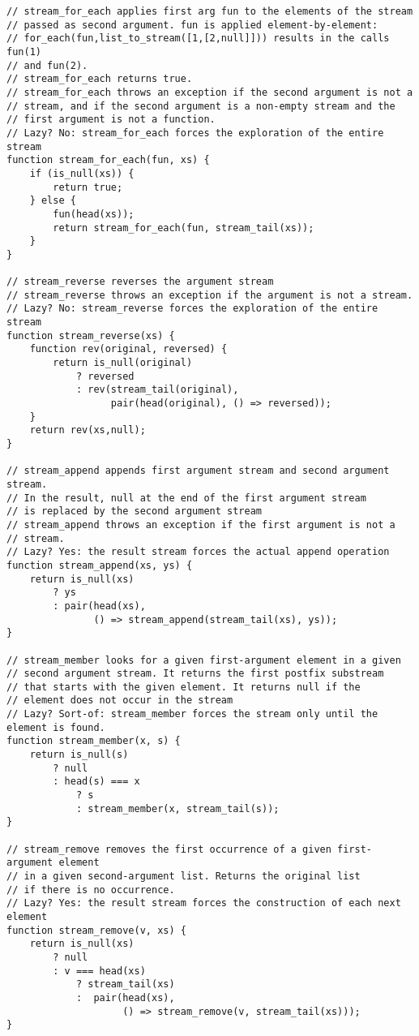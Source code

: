 \begin{lstlisting}
// stream_for_each applies first arg fun to the elements of the stream
// passed as second argument. fun is applied element-by-element:
// for_each(fun,list_to_stream([1,[2,null]])) results in the calls fun(1)
// and fun(2).
// stream_for_each returns true.
// stream_for_each throws an exception if the second argument is not a 
// stream, and if the second argument is a non-empty stream and the
// first argument is not a function.
// Lazy? No: stream_for_each forces the exploration of the entire stream
function stream_for_each(fun, xs) {
    if (is_null(xs)) {
        return true;
    } else {
        fun(head(xs));
        return stream_for_each(fun, stream_tail(xs));
    }
}

// stream_reverse reverses the argument stream
// stream_reverse throws an exception if the argument is not a stream.
// Lazy? No: stream_reverse forces the exploration of the entire stream
function stream_reverse(xs) {
    function rev(original, reversed) {
        return is_null(original)
            ? reversed
            : rev(stream_tail(original), 
                  pair(head(original), () => reversed));
    }
    return rev(xs,null);
}

// stream_append appends first argument stream and second argument stream.
// In the result, null at the end of the first argument stream
// is replaced by the second argument stream
// stream_append throws an exception if the first argument is not a
// stream.
// Lazy? Yes: the result stream forces the actual append operation
function stream_append(xs, ys) {
    return is_null(xs)
        ? ys
        : pair(head(xs),
               () => stream_append(stream_tail(xs), ys)); 
}

// stream_member looks for a given first-argument element in a given
// second argument stream. It returns the first postfix substream
// that starts with the given element. It returns null if the
// element does not occur in the stream
// Lazy? Sort-of: stream_member forces the stream only until the element is found.
function stream_member(x, s) {
    return is_null(s)
        ? null
        : head(s) === x
            ? s
            : stream_member(x, stream_tail(s));
}

// stream_remove removes the first occurrence of a given first-argument element
// in a given second-argument list. Returns the original list
// if there is no occurrence.
// Lazy? Yes: the result stream forces the construction of each next element
function stream_remove(v, xs) {
    return is_null(xs)
        ? null
        : v === head(xs)
            ? stream_tail(xs)
            :  pair(head(xs), 
                    () => stream_remove(v, stream_tail(xs))); 
}


\end{lstlisting}
